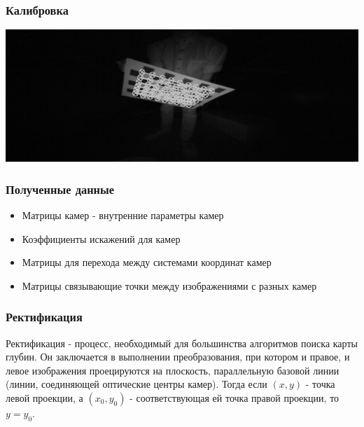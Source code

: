 \documentclass{beamer}
\begin{document}
		\begin{frame}
		    \frametitle{Калибровка}
		   
		    \begin{center}
				\includegraphics[scale=0.7]{images/leftCo2}
			\end{center}
		\end{frame}
		
		\begin{frame}
			\frametitle{Полученные данные}
			
			\begin{itemize}
				\item Матрицы камер - внутренние параметры камер
				\item Коэффициенты искажений для камер
				\item Матрицы для перехода между системами координат камер
				\item Матрицы связывающие точки между изображениями с разных камер
			\end{itemize}
		\end{frame}
		
		\begin{frame}
			\frametitle{Ректификация}
			
			Ректификация - процесс, необходимый для большинства алгоритмов поиска карты
			глубин. Он заключается в выполнении преобразования, при котором и правое, и
			левое изображения проецируются на плоскость, параллельную базовой линии
			(линии, соединяющей оптические центры камер). Тогда если $(x, y)$ - точка
			левой проекции, а $(x_{0},y_{0})$ - соответствующая ей точка правой проекции,
			то $y = y_{0}$.
		\end{frame}
		
\end{document}
